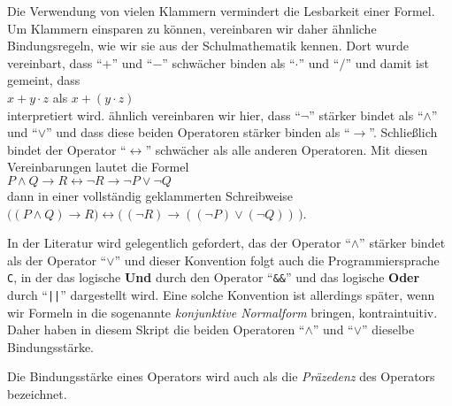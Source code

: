 \begin{enumerate}
      Die Verwendung von vielen Klammern vermindert die Lesbarkeit einer Formel.  Um
      Klammern einsparen zu k\"{o}nnen, vereinbaren wir daher \"{a}hnliche Bindungsregeln, wie wir
      sie aus der Schulmathematik kennen.  Dort wurde vereinbart, dass ``$+$'' und ``$-$'' schw\"{a}cher
      binden als  ``$\cdot $'' und ``$/$'' und damit ist gemeint, dass \\[0.2cm]
      \hspace*{1.3cm} $x + y \cdot z$  \quad als \quad $x + (y \cdot z)$ \\[0.2cm]
      interpretiert wird.  \"{a}hnlich vereinbaren wir hier, dass ``$\neg$'' st\"{a}rker bindet als ``$\wedge$''
      und ``$\vee$'' und dass diese beiden Operatoren st\"{a}rker binden als
      ``$\rightarrow$''.  Schließlich bindet der Operator ``$\leftrightarrow$'' 
      schw\"{a}cher als alle anderen Operatoren.  Mit diesen Vereinbarungen lautet die Formel \\[0.2cm]
      \hspace*{1.3cm} $P \wedge Q \rightarrow R \leftrightarrow \neg R \rightarrow \neg P \vee \neg Q$ \\[0.2cm]
      dann in einer vollst\"{a}ndig geklammerten Schreibweise \\[0.2cm]
      \hspace*{1.3cm}  
      $\bigl((P \wedge Q) \rightarrow R\bigr) \leftrightarrow \bigl(\,(\neg R) \rightarrow ((\neg P) \vee (\neg Q))\,\bigr)$. 
      
      \remark
      In der Literatur wird gelegentlich gefordert, das der Operator ``$\wedge$'' st\"{a}rker
      bindet als der Operator ``$\vee$'' und dieser Konvention folgt auch die
      Programmiersprache \texttt{C}, in der das logische \textbf{Und} durch den Operator
      ``\texttt{\&\&}'' und das logische \textbf{Oder} durch ``\texttt{||}'' dargestellt wird.
      Eine solche Konvention ist allerdings sp\"{a}ter, wenn wir Formeln in die sogenannte
      \emph{konjunktive Normalform} bringen, kontraintuitiv.  Daher haben in diesem Skript
      die beiden Operatoren ``$\wedge$'' und ``$\vee$'' dieselbe Bindungsst\"{a}rke.
      
      \remark
      Die Bindungsst\"{a}rke eines Operators wird auch als die \emph{Pr\"{a}zedenz} des Operators bezeichnet.


\end{enumerate}
